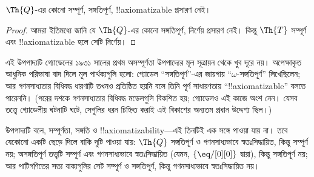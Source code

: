 \documentclass[../../../include/open-logic-section]{subfiles}
\begin{document}


\begin{thm}
$\Th{Q}$-এর কোনো সম্পূর্ণ, সঙ্গতিপূর্ণ, !!{axiomatizable} প্রসারণ নেই।
\end{thm}

\begin{proof}
আমরা ইতিমধ্যে জানি যে $\Th{Q}$-এর কোনো সঙ্গতিপূর্ণ, নির্ণেয় প্রসারণ
নেই। কিন্তু $\Th{T}$ সম্পূর্ণ এবং !!{axiomatizable} হলে সেটি নির্ণেয়।
\end{proof}

\begin{explain}
এই উপপাদ্যটি গ্যোডেলের ১৯৩১ সালের প্রথম অসম্পূর্ণতা উপপাদ্যের মূল
সূত্রায়ন থেকে খুব দূরে নয়। অপেক্ষাকৃত আধুনিক পরিভাষা বাদ দিলে মূল
পার্থক্যগুলি হলো: গ্যোডেল ``সঙ্গতিপূর্ণ''-এর জায়গায়
``$\omega$-সঙ্গতিপূর্ণ'' লিখেছিলেন; আর গণনসাধ্যতার বিধিবদ্ধ ধারণাটি তখনও
প্রতিষ্ঠিত হয়নি বলে তিনি পূর্ণ সাধারণতায় ``!!{axiomatizable}'' বলতে
পারেননি। (পরের দশকে গণনসাধ্যতার বিধিবদ্ধ মডেলগুলি বিকশিত হয়; গ্যোডেলও
এই কাজে অংশ নেন। যেসব তত্ত্বে গ্যোডেলীয় ঘটনাটি ঘটে, সেগুলির ধরন
চিহ্নিত করাই এই বিকাশের অন্যতম প্রধান উদ্দেশ্য ছিল।)

উপপাদ্যটি বলে, সম্পূর্ণতা, সঙ্গতি ও !!{axiomatizability}---এই তিনটিই এক
সঙ্গে পাওয়া যায় না। তবে যেকোনো একটি ছেড়ে দিলে বাকি দুটি পাওয়া যায়:
$\Th{Q}$ সঙ্গতিপূর্ণ ও গণনসাধ্যভাবে স্বতঃসিদ্ধায়িত, কিন্তু সম্পূর্ণ নয়;
অসঙ্গতিপূর্ণ তত্ত্বটি সম্পূর্ণ এবং গণনসাধ্যভাবে স্বতঃসিদ্ধায়িত (যেমন,
$\{ \eq/[0][0] \}$ দ্বারা), কিন্তু সঙ্গতিপূর্ণ নয়; আর পাটিগণিতের সত্য
বাক্যগুলির সেট সম্পূর্ণ ও সঙ্গতিপূর্ণ, কিন্তু গণনসাধ্যভাবে স্বতঃসিদ্ধায়িত
নয়।
\end{explain}
\end{document}
